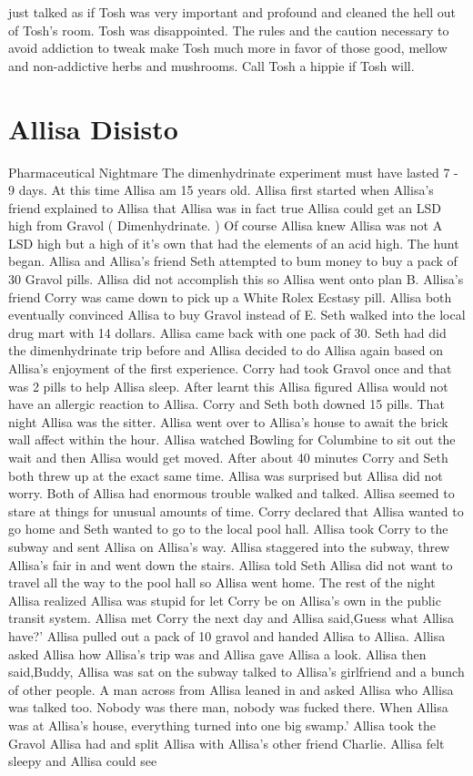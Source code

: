 \documentclass[12pt]{book}
\begin{document}
just talked as if Tosh was very important and profound and cleaned the hell out of Tosh's room. Tosh was disappointed. The rules and the caution necessary to avoid addiction to tweak make Tosh much more in favor of those good, mellow and non-addictive herbs and mushrooms. Call Tosh a hippie if Tosh will.



\chapter{Allisa Disisto}

Pharmaceutical Nightmare The dimenhydrinate experiment must have lasted 7 - 9 days. At this time Allisa am 15 years old. Allisa first started when Allisa's friend explained to Allisa that Allisa was in fact true Allisa could get an LSD high from Gravol ( Dimenhydrinate. ) Of course Allisa knew Allisa was not A LSD high but a high of it's own that had the elements of an acid high. The hunt began. Allisa and Allisa's friend Seth attempted to bum money to buy a pack of 30 Gravol pills. Allisa did not accomplish this so Allisa went onto plan B. Allisa's friend Corry was came down to pick up a White Rolex Ecstasy pill. Allisa both eventually convinced Allisa to buy Gravol instead of E. Seth walked into the local drug mart with 14 dollars. Allisa came back with one pack of 30. Seth had did the dimenhydrinate trip before and Allisa decided to do Allisa again based on Allisa's enjoyment of the first experience. Corry had took Gravol once and that was 2 pills to help Allisa sleep. After learnt this Allisa figured Allisa would not have an allergic reaction to Allisa. Corry and Seth both downed 15 pills. That night Allisa was the sitter. Allisa went over to Allisa's house to await the brick wall affect within the hour. Allisa watched Bowling for Columbine to sit out the wait and then Allisa would get moved. After about 40 minutes Corry and Seth both threw up at the exact same time. Allisa was surprised but Allisa did not worry. Both of Allisa had enormous trouble walked and talked. Allisa seemed to stare at things for unusual amounts of time. Corry declared that Allisa wanted to go home and Seth wanted to go to the local pool hall. Allisa took Corry to the subway and sent Allisa on Allisa's way. Allisa staggered into the subway, threw Allisa's fair in and went down the stairs. Allisa told Seth Allisa did not want to travel all the way to the pool hall so Allisa went home. The rest of the night Allisa realized Allisa was stupid for let Corry be on Allisa's own in the public transit system. Allisa met Corry the next day and Allisa said,Guess what Allisa have?' Allisa pulled out a pack of 10 gravol and handed Allisa to Allisa. Allisa asked Allisa how Allisa's trip was and Allisa gave Allisa a look. Allisa then said,Buddy, Allisa was sat on the subway talked to Allisa's girlfriend and a bunch of other people. A man across from Allisa leaned in and asked Allisa who Allisa was talked too. Nobody was there man, nobody was fucked there. When Allisa was at Allisa's house, everything turned into one big swamp.' Allisa took the Gravol Allisa had and split Allisa with Allisa's other friend Charlie. Allisa felt sleepy and Allisa could see 
\end{document}
